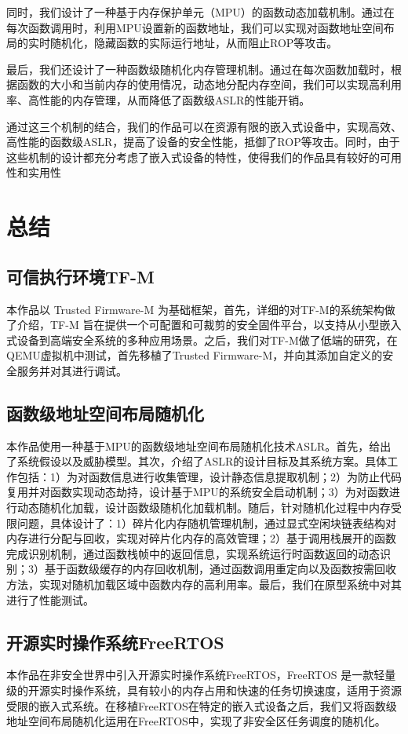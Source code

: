 \documentclass[UTF8,12pt,a4paper,twoside]{ctexart}
\numberwithin{figure}{section}
\begin{document}
\par 同时，我们设计了一种基于内存保护单元（MPU）的函数动态加载机制。通过在每次函数调用时，利用MPU设置新的函数地址，我们可以实现对函数地址空间布局的实时随机化，隐藏函数的实际运行地址，从而阻止ROP等攻击。

\par 最后，我们还设计了一种函数级随机化内存管理机制。通过在每次函数加载时，根据函数的大小和当前内存的使用情况，动态地分配内存空间，我们可以实现高利用率、高性能的内存管理，从而降低了函数级ASLR的性能开销。

\par 通过这三个机制的结合，我们的作品可以在资源有限的嵌入式设备中，实现高效、高性能的函数级ASLR，提高了设备的安全性能，抵御了ROP等攻击。同时，由于这些机制的设计都充分考虑了嵌入式设备的特性，使得我们的作品具有较好的可用性和实用性


\section{总结}
\subsection{可信执行环境TF-M}
\par 本作品以 Trusted Firmware-M 为基础框架，首先，详细的对TF-M的系统架构做了介绍，TF-M 旨在提供一个可配置和可裁剪的安全固件平台，以支持从小型嵌入式设备到高端安全系统的多种应用场景。之后，我们对TF-M做了低端的研究，在QEMU虚拟机中测试，首先移植了Trusted Firmware-M，并向其添加自定义的安全服务并对其进行调试。
\subsection{函数级地址空间布局随机化}
\par 本作品使用一种基于MPU的函数级地址空间布局随机化技术ASLR。首先，给出了系统假设以及威胁模型。其次，介绍了ASLR的设计目标及其系统方案。具体工作包括：1）为对函数信息进行收集管理，设计静态信息提取机制；2）为防止代码复用并对函数实现动态劫持，设计基于MPU的系统安全启动机制；3）为对函数进行动态随机化加载，设计函数级随机化加载机制。随后，针对随机化过程中内存受限问题，具体设计了：1）碎片化内存随机管理机制，通过显式空闲块链表结构对内存进行分配与回收，实现对碎片化内存的高效管理；2）基于调用栈展开的函数完成识别机制，通过函数栈帧中的返回信息，实现系统运行时函数返回的动态识别；3）基于函数级缓存的内存回收机制，通过函数调用重定向以及函数按需回收方法，实现对随机加载区域中函数内存的高利用率。最后，我们在原型系统中对其进行了性能测试。
\subsection{开源实时操作系统FreeRTOS}
\par 本作品在非安全世界中引入开源实时操作系统FreeRTOS，FreeRTOS 是一款轻量级的开源实时操作系统，具有较小的内存占用和快速的任务切换速度，适用于资源受限的嵌入式系统。在移植FreeRTOS在特定的嵌入式设备之后，我们又将函数级地址空间布局随机化运用在FreeRTOS中，实现了非安全区任务调度的随机化。
\clearpage
\pagestyle{refStyle}


\end{document}
